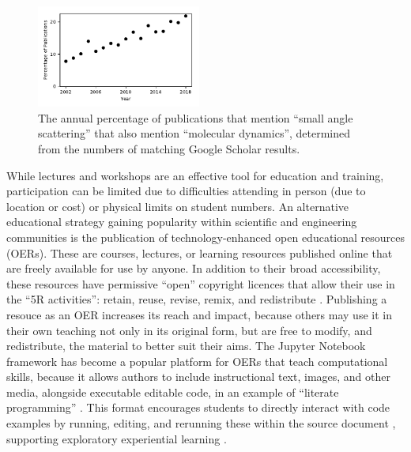 \documentclass[amsmath,amssymb,twocolumn,superscriptaddress]{revtex4-1}
\begin{document}
%
\begin{figure}
\label{fig:growth}
\includegraphics[width=0.48\textwidth]{figures/chem_data_py.pdf}
\caption{The annual percentage of publications that mention ``small angle scattering'' that also mention ``molecular dynamics'', determined from the numbers of matching Google Scholar results.}
\end{figure}
%

While lectures and workshops are an effective tool for education and training, participation can be limited due to difficulties attending in person (due to location or cost) or physical limits on student numbers.
An alternative educational strategy  gaining popularity within scientific and engineering communities is the publication of technology-enhanced open educational resources (OERs).
These are courses, lectures, or learning resources published online that are freely available for use by anyone. In addition to their broad accessibility, these resources have permissive ``open'' copyright licences that allow their use in the ``5R activities'': retain, reuse, revise, remix, and redistribute \cite{wiley_open_2018}.
Publishing a resouce as an OER increases its reach and impact, because others may use it in their own teaching not only in its original form, but are free to modify, and redistribute, the material to better suit their aims.
The Jupyter Notebook framework \cite{kluyver_jupyter_2016} has become a popular platform for OERs that teach computational skills, because it allows authors to include instructional text, images, and other media, alongside executable editable code, in an example of ``literate programming'' \cite{knuth_literate_1984}.
This format encourages students to directly interact with code examples by running, editing, and rerunning these within the source document \cite{barba_cybertraining_2017}, supporting exploratory experiential learning \cite{papert_mindstroms_1993}.
\end{document}
